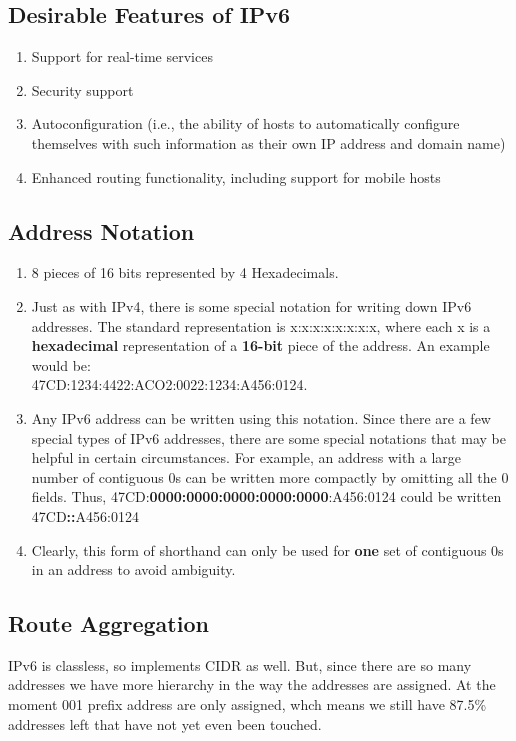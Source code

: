 \documentclass[12pt]{book}
\begin{document}
\subsection{Desirable Features of IPv6}
\begin{enumerate}
    \item Support for real-time services
    \item Security support
    \item Autoconfiguration (i.e., the ability of hosts to automatically configure themselves with such information as their own IP address and domain name)
    \item Enhanced routing functionality, including support for mobile hosts
\end{enumerate}

\subsection{Address Notation}
\begin{enumerate}
    \item 8 pieces of 16 bits represented by 4 Hexadecimals.
    \item Just as with IPv4, there is some special notation for writing down IPv6 addresses. The standard representation is x:x:x:x:x:x:x:x, where each x is a \textbf{hexadecimal} representation of a \textbf{16-bit} piece of the address. An example would be: \\47CD:1234:4422:ACO2:0022:1234:A456:0124.
    \item Any IPv6 address can be written using this notation. Since there are a few special types of IPv6 addresses, there are some special notations that may be helpful in certain circumstances. For example, an address with a large number of contiguous 0s can be written more compactly by omitting all the 0 fields. Thus, 47CD:\textbf{0000:0000:0000:0000:0000}:A456:0124 could be written 47CD\textbf{::}A456:0124
    \item Clearly, this form of shorthand can only be used for \textbf{one} set of contiguous 0s in an address to avoid ambiguity.
\end{enumerate}

\subsection{Route Aggregation}
IPv6 is classless, so implements CIDR as well. But, since there are so many addresses we have more hierarchy in the way the addresses are assigned. At the moment 001 prefix address are only assigned, whch means we still have 87.5\% addresses left that have not yet even been touched.
\end{document}
